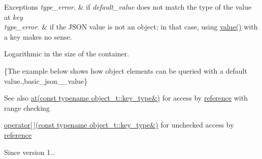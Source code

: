 \begin{DoxyExceptions}{Exceptions}
{\em type\+\_\+error.} & if {\itshape default\+\_\+value} does not match the type of the value at {\itshape key} \\
\hline
{\em type\+\_\+error.} & if the J\+S\+ON value is not an object; in that case, using {\ttfamily \hyperlink{classnlohmann_1_1basic__json_a404017aa52714a0a4bc79d5af7e4ad2b}{value()}} with a key makes no sense.\\
\hline
\end{DoxyExceptions}
Logarithmic in the size of the container.

\{The example below shows how object elements can be queried with a default value.,basic\+\_\+json\+\_\+\+\_\+value\}

\begin{DoxySeeAlso}{See also}
\hyperlink{classnlohmann_1_1basic__json_a93403e803947b86f4da2d1fb3345cf2c}{at(const typename object\+\_\+t\+::key\+\_\+type\&)} for access by \hyperlink{classnlohmann_1_1basic__json_ac6a5eddd156c776ac75ff54cfe54a5bc}{reference} with range checking 

\hyperlink{classnlohmann_1_1basic__json_a233b02b0839ef798942dd46157cc0fe6}{operator\mbox{[}$\,$\mbox{]}(const typename object\+\_\+t\+::key\+\_\+type\&)} for unchecked access by \hyperlink{classnlohmann_1_1basic__json_ac6a5eddd156c776ac75ff54cfe54a5bc}{reference}
\end{DoxySeeAlso}
\begin{DoxySince}{Since}
version 1.. 
\end{DoxySince}
